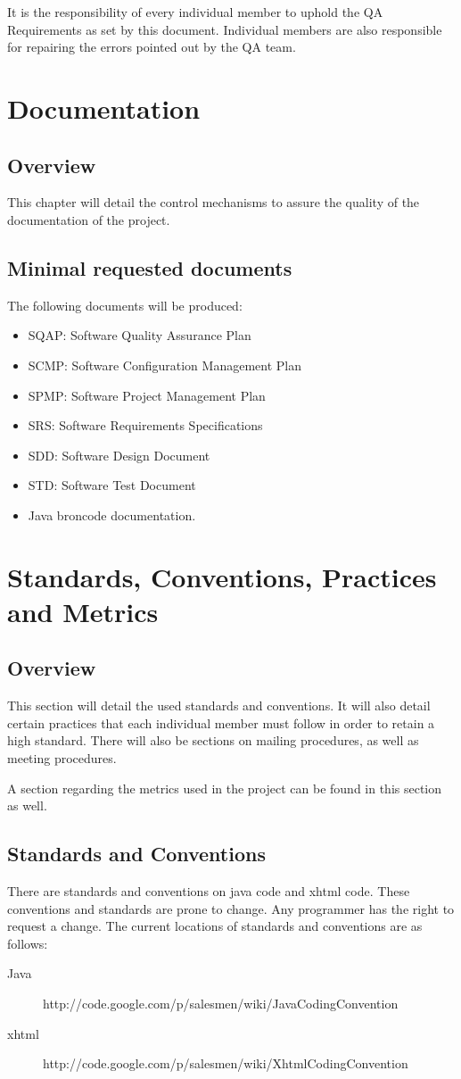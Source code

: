 \documentclass[salesmen, twoside]{../../../templates/latex/2009/softproj}
\begin{document}
\begin{projdoc}
It is the responsibility of every individual member to uphold the QA Requirements as set by this document. Individual members are also responsible for repairing the errors pointed out by the QA team.

\chapter{Documentation}
\section{Overview}
This chapter will detail the control mechanisms to assure the quality of the documentation of the project.
\section{Minimal requested documents}
The following documents will be produced:
\begin{itemize}
\item SQAP: Software Quality Assurance Plan
\item SCMP: Software Configuration Management Plan
\item SPMP: Software Project Management Plan
\item SRS: Software Requirements Specifications
\item SDD: Software Design Document
\item STD: Software Test Document
\item Java broncode documentation.
\end{itemize}

\chapter{Standards, Conventions, Practices and Metrics}
\section{Overview}
This section will detail the used standards and conventions. It will also detail certain practices that each individual member must follow in order to retain a high standard. There will also be sections on mailing procedures, as well as meeting procedures.

A section regarding the metrics used in the project can be found in this section as well.

\section{Standards and Conventions}
There are standards and conventions on java code and xhtml code. These conventions and standards are prone to change. Any programmer has the right to request a change. The current locations of standards and conventions are as follows:
\begin{description}
\item[Java]
http://code.google.com/p/salesmen/wiki/JavaCodingConvention
\item[xhtml]
http://code.google.com/p/salesmen/wiki/XhtmlCodingConvention
\end{description}


\end{projdoc}
\end{document}
